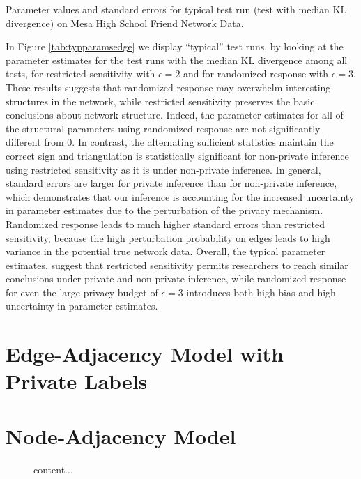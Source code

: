     \begin{table}[h]
  	\caption{Parameter values and standard errors for typical test run (test with median KL divergence) on Mesa High School Friend Network Data.} 
  	\label{tab:typparamsedge}
  	\centering
  	
  \end{table}
  
  In Figure \ref{tab:typparamsedge} we display ``typical'' test runs, by looking at the parameter estimates for the test runs with the median KL divergence among all tests, for  restricted sensitivity with $\epsilon=2$ and for randomized response with $\epsilon=3$. These results suggests that randomized response may overwhelm interesting structures in the network, while restricted sensitivity preserves the basic conclusions about network structure. Indeed, the parameter estimates for all of the structural parameters using randomized response are not significantly different from $0$. In contrast, the alternating sufficient statistics maintain the correct sign and triangulation is statistically significant for non-private inference using restricted sensitivity as it is under non-private inference. In general, standard errors are larger for private inference than for non-private inference, which demonstrates that our inference is accounting for the increased uncertainty in parameter estimates due to the perturbation of the privacy mechanism. Randomized response leads to much higher standard errors than restricted sensitivity, because the high perturbation probability on edges leads to high variance in the potential true network data. Overall, the typical parameter estimates, suggest that restricted sensitivity permits researchers to reach similar conclusions under private and non-private inference, while randomized response for even the large privacy budget of $\epsilon=3$ introduces both high bias and high uncertainty in parameter estimates.
 
 
 \section{Edge-Adjacency Model with Private Labels}

 
 \section{Node-Adjacency Model}
 
\begin{figure}
	content...
\end{figure}
 